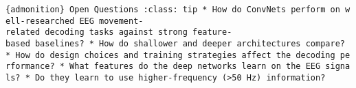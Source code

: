 \documentclass[11pt]{article}
\begin{document}
    \texttt{\{admonition\}\ Open\ Questions\ :class:\ tip\ *\ How\ do\ ConvNets\ perform\ on\ well-researched\ EEG\ movement-related\ decoding\ tasks\ against\ strong\ feature-based\ baselines?\ *\ How\ do\ shallower\ and\ deeper\ architectures\ compare?\ *\ How\ do\ design\ choices\ and\ training\ strategies\ affect\ the\ decoding\ performance?\ *\ What\ features\ do\ the\ deep\ networks\ learn\ on\ the\ EEG\ signals?\ *\ Do\ they\ learn\ to\ use\ higher-frequency\ (\textgreater{}50\ Hz)\ information?}


    
    
    
\end{document}
